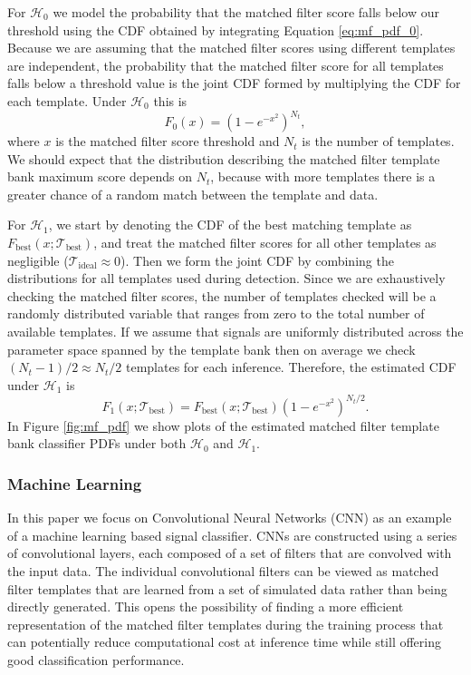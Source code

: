 For $\mathcal{H}_0$ we model the probability that the matched filter score falls below our threshold using the CDF obtained by integrating Equation \ref{eq:mf_pdf_0}. Because we are assuming that the matched filter scores using different templates are independent, the probability that the matched filter score for all templates falls below a threshold value is the joint CDF formed by multiplying the CDF for each template. Under $\mathcal{H}_0$ this is
\begin{equation}
    F_{0}(x) = \left(1-e^{-x^2}\right)^{N_t},
    \label{eq:mf_joint_cdf_0}
\end{equation}
where $x$ is the matched filter score threshold and $N_t$ is the number of templates. We should expect that the distribution describing the matched filter template bank maximum score depends on $N_t$, because with more templates there is a greater chance of a random match between the template and data.

For $\mathcal{H}_1$, we start by denoting the CDF of the best matching template as $F_\mathrm{best}(x;\mathcal{T}_\mathrm{best})$, and treat the matched filter scores for all other templates as negligible ($\mathcal{T}_\mathrm{ideal}\approx0$). Then we form the joint CDF by combining the distributions for all templates used during detection. Since we are exhaustively checking the matched filter scores, the number of templates checked will be a randomly distributed variable that ranges from zero to the total number of available templates. If we assume that signals are uniformly distributed across the parameter space spanned by the template bank then on average we check $(N_t-1)/2\approx N_t/2$ templates for each inference. Therefore, the estimated CDF under $\mathcal{H}_1$ is
\begin{equation}
    F_{1}(x;\mathcal{T}_\mathrm{best})=F_\mathrm{best}(x;\mathcal{T}_\mathrm{best})\left(1-e^{-x^2}\right)^{N_t/2}.
\end{equation}
In Figure \ref{fig:mf_pdf} we show plots of the estimated matched filter template bank classifier PDFs under both $\mathcal{H}_0$ and $\mathcal{H}_1$.

\subsubsection{Machine Learning}
In this paper we focus on Convolutional Neural Networks (CNN) as an example of a machine learning based signal classifier. CNNs are constructed using a series of convolutional layers, each composed of a set of filters that are convolved with the input data. The individual convolutional filters can be viewed as matched filter templates that are learned from a set of simulated data rather than being directly generated. This opens the possibility of finding a more efficient representation of the matched filter templates during the training process that can potentially reduce computational cost at inference time while still offering good classification performance. 

